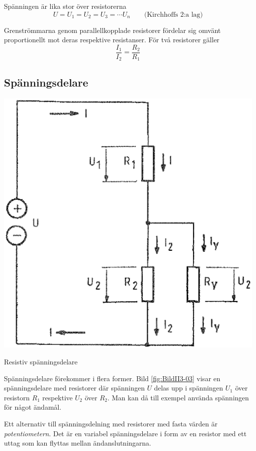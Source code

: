 Spänningen är lika stor över resistorerna
\[ U = U_1 = U_2 = U_3 = \cdots U_n \qquad \text{(Kirchhoffs 2:a lag)} \]

Grenströmmarna genom parallellkopplade resistorer fördelar sig omvänt
proportionellt mot deras respektive resistanser. För två resistorer
gäller
\[\frac{I_1}{I_2} = \frac{R_2}{R_1}\]

\subsection{Spänningsdelare}

\begin{marginfigure}
\includegraphics[width=\textwidth]{images/cropped_pdfs/bild_2_3-03.pdf}
\caption{Resistiv spänningsdelare}
\label{fig:BildII3-03}
\end{marginfigure}

Spänningsdelare förekommer i flera former.
Bild \ref{fig:BildII3-03} visar en spänningsdelare med resistorer där
spänningen \(U\) delas upp i spänningen \(U_1\) över resistorn \(R_1\)
respektive \(U_2\) över \(R_2\).
Man kan då till exempel använda spänningen för något ändamål.

Ett alternativ till spänningsdelning med resistorer med fasta värden är
\emph{potentiometern}. Det är en variabel spänningsdelare i form av en resistor
med ett uttag som kan flyttas mellan ändanslutningarna.

